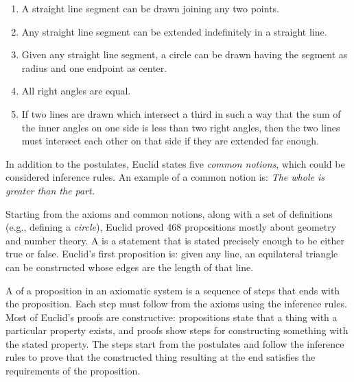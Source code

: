 \begin{schemeregion}
{\begin{enumerate}
\item A straight line segment can be drawn joining any two points.
\item Any straight line segment can be extended indefinitely in a straight line.
\item Given any straight line segment, a circle can be drawn having the segment as radius and one endpoint as center.
\item All right angles are equal.
\item If two lines are drawn which intersect a third in such a way that the sum of the inner angles on one side is less than two right angles, then the two lines must intersect each other on that side if they are extended far enough.
\end{enumerate}

} In addition to the postulates, Euclid states five \emph{common notions}, which could be considered inference rules.  An example of a common notion is: \emph{The whole is greater than the part.}

Starting from the axioms and common notions, along with a set of definitions (e.g., defining a \emph{circle}), Euclid proved 468 propositions mostly about geometry and number theory.  A  is a statement that is stated precisely enough to be either true or false.  Euclid's first proposition is: given any line, an equilateral triangle can be constructed whose edges are the length of that line.

A  of a proposition in an axiomatic system is a sequence of steps that ends with the proposition.  Each step must follow from the axioms using the inference rules.  Most of Euclid's proofs are constructive: propositions state that a thing with a particular property exists, and proofs show steps for constructing something with the stated property.  The steps start from the postulates and follow the inference rules to prove that the constructed thing resulting at the end satisfies the requirements of the proposition.



\end{schemeregion}
